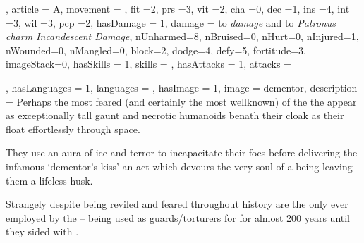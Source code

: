 {{


, article = A, movement = , fit =2, prs =3, vit =2, cha =0, dec =1, ins =4, int =3, wil =3, pcp =2, hasDamage = 1, damage = to \textit{ damage} and  to \textit{Patronus charm\comma{} Incandescent Damage}, nUnharmed=8, nBruised=0, nHurt=0, nInjured=1, nWounded=0, nMangled=0, block=2, dodge=4, defy=5, fortitude=3, imageStack=0, hasSkills = 1, skills = 
, hasAttacks = 1, attacks = 


, hasLanguages = 1, languages = , hasImage = 1, image = dementor, description = Perhaps the most feared (and certainly the most well\minus{}known) of the \comma{} the \name{} appear as exceptionally tall\comma{} gaunt and necrotic humanoids benath their cloak\comma{} as their float effortlessly through space. 

They use an aura of ice and terror to incapacitate their foes\comma{} before delivering the infamous `dementor’s kiss’\comma{} an act which devours the very soul of a being\comma{} leaving them a lifeless husk. 

Strangely\comma{} despite being reviled and feared throughout history\comma{}  are the only  ever employed by the  – being used as guards/torturers for  for almost 200 years\comma{} until they sided with .}
}
